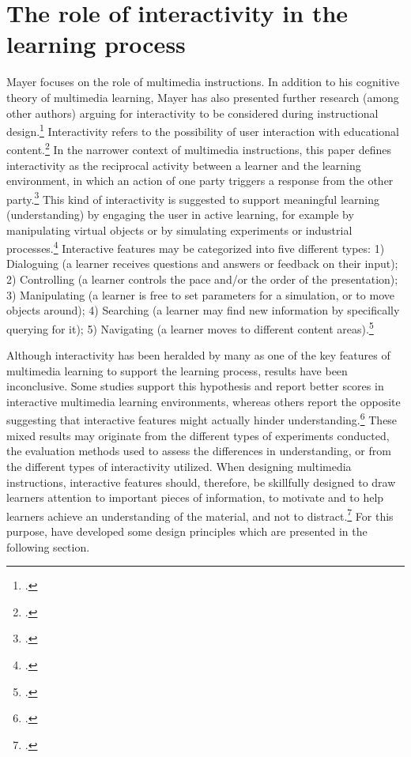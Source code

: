 \section{The role of interactivity in the learning process} \label{sec:Interactivity}
Mayer focuses on the role of multimedia instructions. In addition to his cognitive theory of multimedia learning, Mayer has also presented further research (among other authors) arguing for interactivity to be considered during instructional design.\footcites[Cf.][chapter 2, paragraph 12]{ClarkElearningscienceinstruction2016} Interactivity refers to the possibility of user interaction with educational content.\footcites[Cf.][p.292]{PatwardhanWhendoeshigher2015} In the narrower context of multimedia instructions, this paper defines interactivity as the reciprocal activity between a learner and the learning environment, in which an action of one party triggers a response from the other party.\footcites[Cf.][p.1025]{DomagkInteractivitymultimedialearning2010} This kind of interactivity is suggested to support meaningful learning (understanding) by engaging the user in active learning, for example by manipulating virtual objects or by simulating experiments or industrial processes.\footcites[Cf.][p.161]{CairncrossInteractiveMultimediaLearning2001}[cf.][p.1159]{Evansinteractivityeffectmultimedia2007} Interactive features may be categorized into five different types: 1) Dialoguing (a learner receives questions and answers or feedback on their input); 2) Controlling (a learner controls the pace and/or the order of the presentation); 3) Manipulating (a learner is free to set parameters for a simulation, or to move objects around); 4) Searching (a learner may find new information by specifically querying for it); 5) Navigating (a learner moves to different content areas).\footcites[Cf.][p.311]{MorenoInteractiveMultimodalLearning2007}

Although interactivity has been heralded by many as one of the key features of multimedia learning to support the learning process, results have been inconclusive. Some studies support this hypothesis and report better scores in interactive multimedia learning environments, whereas others report the opposite suggesting that interactive features might actually hinder understanding.\footcites[Cf.][p.1024]{DomagkInteractivitymultimedialearning2010}[cf.][]{MayerWhenLearningJust2001}[cf.][p.156]{CairncrossInteractiveMultimediaLearning2001}[cf.][p. 1148 et seqq]{Evansinteractivityeffectmultimedia2007}[cf.][p.48]{SordenCognitiveTheoryMultimedia2012} These mixed results may originate from the different types of experiments conducted, the evaluation methods used to assess the differences in understanding, or from the different types of interactivity utilized. When designing multimedia instructions, interactive features should, therefore, be skillfully designed to draw learners attention to important pieces of information, to motivate and to help learners achieve an understanding of the material, and not to distract.\footcites[Cf.][p.21]{KirshInteractivitymultimediainterfaces1997}[cf.][p.15]{LeeScreenDesignGuidelines1999} For this purpose, \cite{MorenoInteractiveMultimodalLearning2007} have developed some design principles which are presented in the following section.

